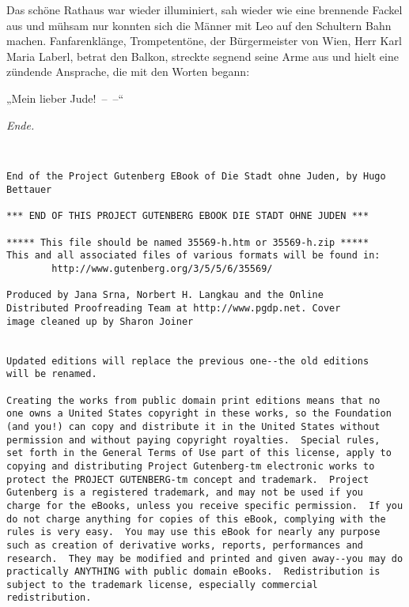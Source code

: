 Das schöne Rathaus war wieder illuminiert, sah wieder wie eine
brennende Fackel aus und mühsam nur konnten sich die Männer mit Leo
auf den Schultern Bahn machen. Fanfarenklänge, Trompetentöne, der
Bürgermeister von Wien, Herr Karl Maria Laberl, betrat den Balkon,
streckte segnend seine Arme aus und hielt eine zündende Ansprache,
die mit den Worten begann:

„Mein lieber Jude!~–~–“

\begin{center}
\textit{Ende.}

\end{center}

\begin{Verbatim}[fontsize=\footnotesize]


End of the Project Gutenberg EBook of Die Stadt ohne Juden, by Hugo Bettauer

*** END OF THIS PROJECT GUTENBERG EBOOK DIE STADT OHNE JUDEN ***

***** This file should be named 35569-h.htm or 35569-h.zip *****
This and all associated files of various formats will be found in:
        http://www.gutenberg.org/3/5/5/6/35569/

Produced by Jana Srna, Norbert H. Langkau and the Online
Distributed Proofreading Team at http://www.pgdp.net. Cover
image cleaned up by Sharon Joiner


Updated editions will replace the previous one--the old editions
will be renamed.

Creating the works from public domain print editions means that no
one owns a United States copyright in these works, so the Foundation
(and you!) can copy and distribute it in the United States without
permission and without paying copyright royalties.  Special rules,
set forth in the General Terms of Use part of this license, apply to
copying and distributing Project Gutenberg-tm electronic works to
protect the PROJECT GUTENBERG-tm concept and trademark.  Project
Gutenberg is a registered trademark, and may not be used if you
charge for the eBooks, unless you receive specific permission.  If you
do not charge anything for copies of this eBook, complying with the
rules is very easy.  You may use this eBook for nearly any purpose
such as creation of derivative works, reports, performances and
research.  They may be modified and printed and given away--you may do
practically ANYTHING with public domain eBooks.  Redistribution is
subject to the trademark license, especially commercial
redistribution.




\end{Verbatim}
